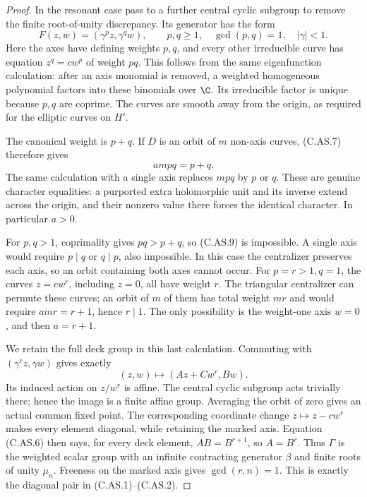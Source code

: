 \begin{proof}
In the resonant case pass to a further central cyclic
subgroup to remove the finite root-of-unity discrepancy.
Its generator has the form
\[
                 F(z,w)=(\gamma^p z,\gamma^q w),
       \qquad p,q\ge1,\quad\gcd(p,q)=1,\quad |\gamma|<1 .
                                                               \tag{C.AS.8}
\]
Here the axes have defining weights $p,q$, and every
other irreducible curve has equation $z^q=cw^p$ of
weight $pq$. This follows from the same eigenfunction
calculation: after an axis monomial is removed, a
weighted homogeneous polynomial factors into these
binomials over $\C$. Its irreducible factor is unique
because $p,q$ are coprime. The curves are smooth away
from the origin, as required for the elliptic curves
on $H'$.

The canonical weight is $p+q$. If $D$ is an orbit of
$m$ non-axis curves, (C.AS.7) therefore gives
\[
                              ampq=p+q.                 \tag{C.AS.9}
\]
The same calculation with a single axis replaces $mpq$
by $p$ or $q$. These are genuine character equalities:
a purported extra holomorphic unit and its inverse
extend across the origin, and their nonzero value there
forces the identical character. In particular $a>0$.

For $p,q>1$, coprimality gives $pq>p+q$, so (C.AS.9)
is impossible. A single axis would require $p\mid q$
or $q\mid p$, also impossible. In this case the
centralizer preserves each axis, so an orbit containing
both axes cannot occur. For $p=r>1,q=1$, the curves
$z=cw^r$, including $z=0$, all have weight $r$.
The triangular centralizer can permute these curves;
an orbit of $m$ of them has total weight $mr$ and
would require $amr=r+1$, hence $r\mid1$.
The only possibility is the weight-one axis $w=0$,
and then $a=r+1$.

We retain the full deck group in this last calculation.
Commuting with $(\gamma^rz,\gamma w)$ gives exactly
\[
              (z,w)\longmapsto(Az+Cw^r,Bw).             \tag{C.AS.10}
\]
Its induced action on $z/w^r$ is affine. The central
cyclic subgroup acts trivially there; hence the image
is a finite affine group. Averaging the orbit of zero
gives an actual common fixed point. The corresponding
coordinate change $z\mapsto z-cw^r$ makes every element
diagonal, while retaining the marked axis. Equation
(C.AS.6) then says, for every deck element,
$AB=B^{r+1}$, so $A=B^r$. Thus $\Gamma$ is the
weighted scalar group with an infinite contracting
generator $\beta$ and finite roots of unity
$\mu_n$. Freeness on the marked axis gives
$\gcd(r,n)=1$. This is exactly the diagonal pair in
(C.AS.1)--(C.AS.2).


\end{proof}
